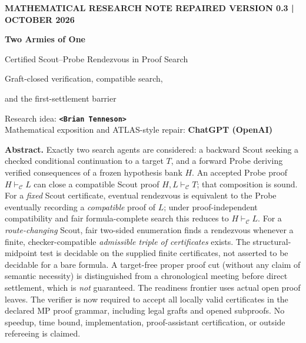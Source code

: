 \documentclass[11pt,letterpaper]{article}
\theoremstyle{definition}
\newcommand{\vdC}{\vdash_{\mathcal C}}
\begin{document}
\thispagestyle{plain}
\vspace*{.18in}
{\small\sffamily\bfseries\color{Probe} MATHEMATICAL RESEARCH NOTE \hfill REPAIRED VERSION 0.3\; | OCTOBER 2026}\par
\vspace{.30in}
{\color{Ink}\bfseries\fontsize{25}{29}\selectfont Two Armies of One}\par
\vspace{.11in}
{\color{Ink}\fontsize{16}{21}\selectfont Certified Scout--Probe Rendezvous in Proof Search}\par
\vspace{.12in}
{\color{Scout}\large Graft-closed verification, compatible search,\par and the first-settlement barrier}\par
\vspace{.26in}
{\color{Ink}\small Research idea: \textbf{\texttt{\textless{}Brian Tenneson\textgreater{}}}\\ Mathematical exposition and ATLAS-style repair: \textbf{ChatGPT (OpenAI)}}\par
\vspace{.15in}
{}\par
\vspace{.27in}
\begin{keybox}
\textbf{Abstract.} Exactly two search agents are considered: a backward Scout seeking a
checked conditional continuation to a target $T$, and a forward Probe deriving
verified consequences of a frozen hypothesis bank $H$. An accepted Probe proof
$H\vdC L$ can close a compatible Scout proof $H,L\vdC T$; that composition
is sound. For a \emph{fixed} Scout certificate, eventual rendezvous is equivalent
to the Probe eventually recording a \emph{compatible} proof of $L$; under
proof-independent compatibility and fair formula-complete search this
reduces to $H\vdC L$. For a \emph{route-changing}
Scout, fair two-sided enumeration finds a rendezvous whenever a finite,
checker-compatible \emph{admissible triple of certificates} exists. The
structural-midpoint test is decidable on the supplied finite certificates,
not asserted to be decidable for a bare formula. A target-free proper proof cut
(without any claim of semantic necessity) is distinguished from a chronological meeting before direct settlement, which
is \emph{not} guaranteed. The readiness frontier uses actual open proof leaves.
The verifier is now required to accept all locally valid certificates
in the declared MP proof grammar, including legal grafts and opened
subproofs. No speedup, time bound, implementation, proof-assistant
certification, or outside refereeing is claimed.
\end{keybox}
\end{document}
